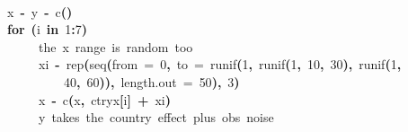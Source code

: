 \documentclass[a4paper]{article}
\newcommand{\hlnumber}[1]{\textcolor[rgb]{0.0823529411764706,0.0784313725490196,0.709803921568627}{#1}}%
\newcommand{\hlfunctioncall}[1]{\textcolor[rgb]{1,0,0}{#1}}%
\newcommand{\hlkeyword}[1]{\textcolor[rgb]{0,0,0}{\textbf{#1}}}%
\newcommand{\hlargument}[1]{\textcolor[rgb]{0.694117647058824,0.247058823529412,0.0196078431372549}{#1}}%
\newcommand{\hlcomment}[1]{\textcolor[rgb]{0.8,0.8,0.8}{#1}}%
\newcommand{\hlassignement}[1]{\textcolor[rgb]{0.215686274509804,0.215686274509804,0.384313725490196}{\textbf{#1}}}%
\newcommand{\hlsymbol}[1]{\textcolor[rgb]{0,0,0}{#1}}%
\newcommand{\hlprompt}[1]{\textcolor[rgb]{0,0,0}{#1}}%
\newcommand{\hlstd}[1]{\textcolor[rgb]{0,0,0}{#1}}%
\newenvironment{Houtput}{\raggedright}{%
%
}
\begin{document}
\begin{Houtput}
\normalfont
\hspace*{\fill}\\
\hlstd{}\ttfamily\noindent
\hlprompt{\usebox{\hlnormalsizeboxgreaterthan}{\ }}\hlsymbol{x}{\ }\hlassignement{\usebox{\hlnormalsizeboxlessthan}-}{\ }\hlsymbol{y}{\ }\hlassignement{\usebox{\hlnormalsizeboxlessthan}-}{\ }\hlfunctioncall{c}\hlkeyword{(}\hlkeyword{)}\mbox{}
\normalfont
\hspace*{\fill}\\
\hlstd{}\ttfamily\noindent
\hlprompt{\usebox{\hlnormalsizeboxgreaterthan}{\ }}\hlkeyword{for}{\ }\hlkeyword{(}\hlsymbol{i}{\ }\hlkeyword{in}{\ }\hlnumber{1}\hlkeyword{:}\hlnumber{7}\hlkeyword{)}{\ }\hlkeyword{\usebox{\hlnormalsizeboxopenbrace}}\hspace*{\fill}\\
\hlstd{}\hlprompt{{\ }}{\ }{\ }{\ }{\ }\hlcomment{\usebox{\hlnormalsizeboxhash}{\ }the{\ }x{\ }range{\ }is{\ }random{\ }too}\hspace*{\fill}\\
\hlstd{}\hlprompt{{\ }}{\ }{\ }{\ }{\ }\hlsymbol{xi}{\ }\hlassignement{\usebox{\hlnormalsizeboxlessthan}-}{\ }\hlfunctioncall{rep}\hlkeyword{(}\hlfunctioncall{seq}\hlkeyword{(}\hlargument{from}{\ }\hlargument{=}{\ }\hlnumber{0}\hlkeyword{,}{\ }\hlargument{to}{\ }\hlargument{=}{\ }\hlfunctioncall{runif}\hlkeyword{(}\hlnumber{1}\hlkeyword{,}{\ }\hlfunctioncall{runif}\hlkeyword{(}\hlnumber{1}\hlkeyword{,}{\ }\hlnumber{10}\hlkeyword{,}{\ }\hlnumber{30}\hlkeyword{)}\hlkeyword{,}{\ }\hlfunctioncall{runif}\hlkeyword{(}\hlnumber{1}\hlkeyword{,}\hspace*{\fill}\\
\hlstd{}\hlprompt{{\ }}{\ }{\ }{\ }{\ }{\ }{\ }{\ }{\ }\hlnumber{40}\hlkeyword{,}{\ }\hlnumber{60}\hlkeyword{)}\hlkeyword{)}\hlkeyword{,}{\ }\hlargument{length.out}{\ }\hlargument{=}{\ }\hlnumber{50}\hlkeyword{)}\hlkeyword{,}{\ }\hlnumber{3}\hlkeyword{)}\hspace*{\fill}\\
\hlstd{}\hlprompt{{\ }}{\ }{\ }{\ }{\ }\hlsymbol{x}{\ }\hlassignement{\usebox{\hlnormalsizeboxlessthan}-}{\ }\hlfunctioncall{c}\hlkeyword{(}\hlsymbol{x}\hlkeyword{,}{\ }\hlsymbol{ctry\usebox{\hlnormalsizeboxunderscore}x}\hlkeyword{[}\hlsymbol{i}\hlkeyword{]}{\ }\hlkeyword{+}{\ }\hlsymbol{xi}\hlkeyword{)}\hspace*{\fill}\\
\hlstd{}\hlprompt{{\ }}{\ }{\ }{\ }{\ }\hlcomment{\usebox{\hlnormalsizeboxhash}{\ }y{\ }takes{\ }the{\ }country{\ }effect{\ }plus{\ }obs{\ }noise}\hspace*{\fill}\\

\end{Houtput}
\end{document}
